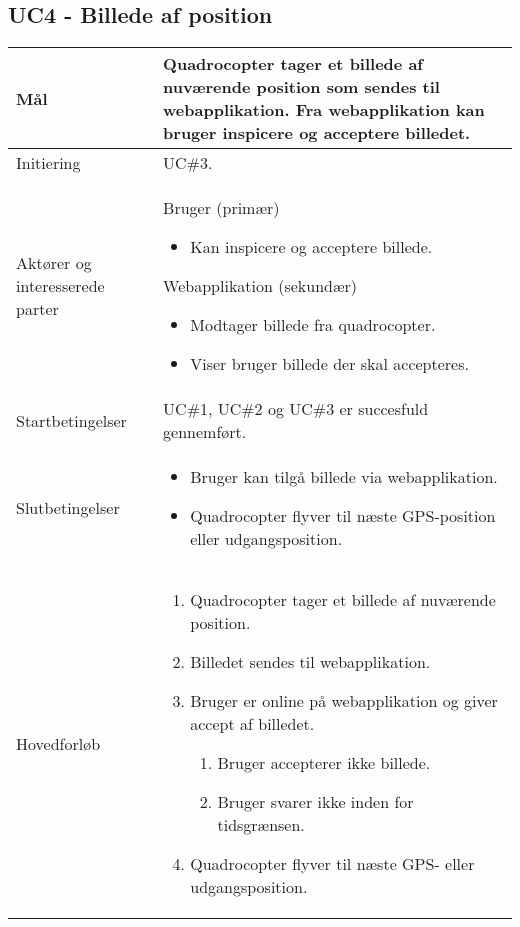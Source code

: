 \subsection*{UC4 - Billede af position}

\begin{table}[H]
\begin{tabular}{|l|p{10cm}|}
\hline

Mål	 							& Quadrocopter tager et billede af nuværende position som sendes til webapplikation. Fra webapplikation kan bruger inspicere og acceptere billedet. \\\hline
Initiering 							& UC\#3. \\\hline
Aktører og interesserede parter			& Bruger (primær) 
										\begin{itemize}
											\item Kan inspicere og acceptere billede.
										\end{itemize} 
									  Webapplikation (sekundær)
										\begin{itemize}
											\item Modtager billede fra quadrocopter.
											\item Viser bruger billede der skal accepteres.
										\end{itemize} \\\hline
Startbetingelser							& UC\#1, UC\#2 og UC\#3 er succesfuld gennemført. \\\hline
Slutbetingelser						& 	\begin{itemize}
											\item Bruger kan tilgå billede via webapplikation.
											\item Quadrocopter flyver til næste GPS-position eller udgangsposition.
										\end{itemize} \\\hline
Hovedforløb				&
 
									\renewcommand{\labelenumi}{\arabic{enumi}.}
									\renewcommand{\labelenumii}{\Roman{enumii}:}

									\begin{enumerate}[topsep=0.0cm, leftmargin=0.5cm]
										\item Quadrocopter tager et billede af nuværende position.
										\item Billedet sendes til webapplikation.
										\item Bruger er online på webapplikation og giver accept af billedet.
											\begin{enumerate}[partopsep=4cm, topsep=0cm, leftmargin=1cm]
												\item Bruger accepterer ikke billede.
												\item Bruger svarer ikke inden for tidsgrænsen.
											\end{enumerate}
										\item Quadrocopter flyver til næste GPS- eller udgangsposition.
									\end{enumerate} \\\hline	


\end{tabular}
\end{table}
